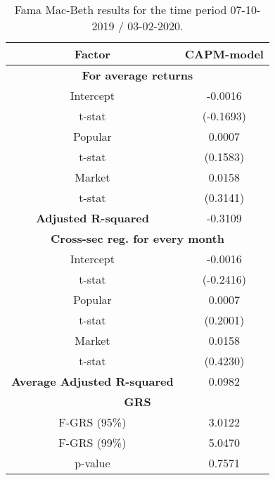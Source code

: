 \begin{table}[h!]
	\centering
	\captionsetup{skip=0.5\baselineskip}
	\caption{Fama Mac-Beth results for the time period 07-10-2019 / 03-02-2020.}
	\begin{tabular}{|c|c|}
		\hline
		\textbf{Factor} & \textbf{CAPM-model} \\ \hline
		\multicolumn{2}{|c|}{\textbf{For average returns}} \\ \hline
		Intercept & -0.0016 \\ 
		t-stat & (-0.1693) \\ \hline
		Popular & 0.0007 \\ 
		t-stat & (0.1583)\\ \hline
		Market & 0.0158 \\
		t-stat & (0.3141)\\ \hline
		\textbf{Adjusted R-squared} & -0.3109 \\ \hline
		\multicolumn{2}{|c|}{\textbf{Cross-sec reg. for every month}} \\ \hline
		Intercept & -0.0016 \\ 
		t-stat & (-0.2416) \\ \hline
		Popular & 0.0007 \\ 
		t-stat & (0.2001)\\ \hline
		Market & 0.0158 \\
		t-stat & (0.4230)\\ \hline
		\textbf{Average Adjusted R-squared} & 0.0982 \\ \hline
		\multicolumn{2}{|c|}{\textbf{GRS}} \\ \hline
		F-GRS (95\%) & 3.0122 \\ \hline
		F-GRS (99\%) & 5.0470 \\ \hline
		p-value & 0.7571 \\ \hline
	\end{tabular}
\end{table}

